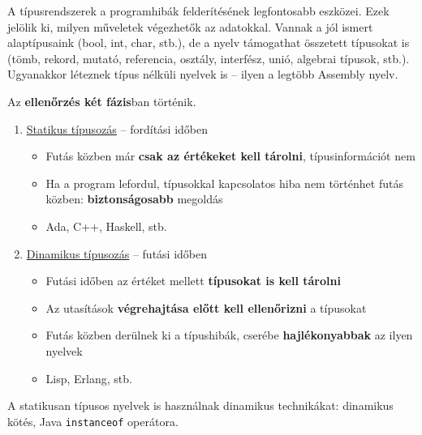 A típusrendszerek a programhibák felderítésének legfontosabb eszközei. Ezek jelölik ki, milyen műveletek végezhetők az adatokkal. Vannak a jól ismert alaptípusaink (bool, int, char, stb.), de a nyelv támogathat összetett típusokat is (tömb, rekord, mutató, referencia, osztály, interfész, unió, algebrai típusok, stb.). Ugyanakkor léteznek típus nélküli nyelvek is -- ilyen a legtöbb Assembly nyelv.


Az \textbf{ellenőrzés két fázis}ban történik.

\begin{enumerate}
	\item \underline{Statikus típusozás} -- fordítási időben
	\begin{itemize}
		\item Futás közben már \textbf{csak az értékeket kell tárolni}, típusinformációt nem
		\item Ha a program lefordul, típusokkal kapcsolatos hiba nem történhet futás közben: \textbf{biztonságosabb} megoldás
		\item Ada, C++, Haskell, stb.
	\end{itemize}
	\item \underline{Dinamikus típusozás} -- futási időben
	\begin{itemize}
		\item Futási időben az értéket mellett \textbf{típusokat is kell tárolni}
		\item Az utasítások \textbf{végrehajtása előtt kell ellenőrizni} a típusokat
		\item Futás közben derülnek ki a típushibák, cserébe \textbf{hajlékonyabbak} az ilyen nyelvek
		\item Lisp, Erlang, stb.
	\end{itemize}
\end{enumerate}

A statikusan típusos nyelvek is használnak dinamikus technikákat: dinamikus kötés, Java \texttt{instanceof} operátora.

